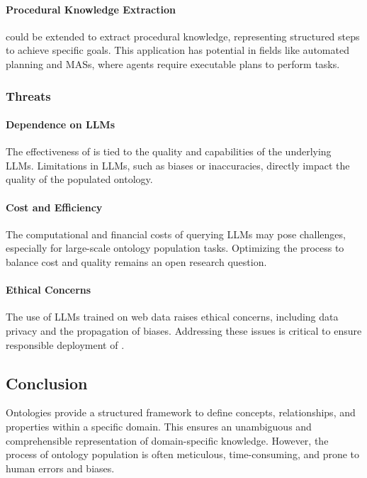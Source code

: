 \paragraph{Procedural Knowledge Extraction}
%
\llmfkg{} could be extended to extract procedural knowledge, representing structured steps to achieve specific goals.
%
This application has potential in fields like automated planning and \glspl{MAS}, where agents require executable plans to perform tasks.


\subsubsection{Threats}
\label{subsubsec:threats}
%
\paragraph{Dependence on \glspl{LLM}}
%
The effectiveness of \llmfkg{} is tied to the quality and capabilities of the underlying \glspl{LLM}.
%
Limitations in \glspl{LLM}, such as biases or inaccuracies, directly impact the quality of the populated ontology.

\paragraph{Cost and Efficiency}
%
The computational and financial costs of querying \glspl{LLM} may pose challenges, especially for large-scale ontology population tasks.
%
Optimizing the process to balance cost and quality remains an open research question.

\paragraph{Ethical Concerns}
%
The use of \glspl{LLM} trained on web data raises ethical concerns, including data privacy and the propagation of biases.
%
Addressing these issues is critical to ensure responsible deployment of \llmfkg{}.



\subsection{Conclusion}
\label{sec:kgfiller-conclusion}
%
Ontologies provide a structured framework to define concepts, relationships, and properties within a specific domain.
%
This ensures an unambiguous and comprehensible representation of domain-specific knowledge.
%
However, the process of ontology population is often meticulous, time-consuming, and prone to human errors and biases.
%

